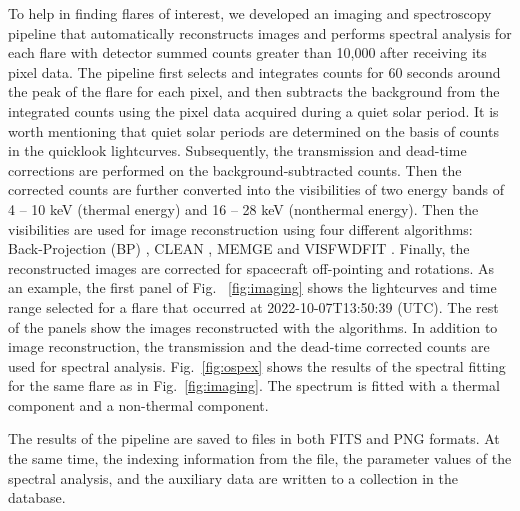 \documentclass[referee]{preaa} %
\begin{document}
To help in finding flares of interest, we developed an imaging and spectroscopy pipeline that automatically reconstructs images and performs spectral analysis for each flare with detector summed counts greater than 10,000
after receiving its pixel data. 
The pipeline first selects and integrates counts for 60 seconds around the peak of the flare for each pixel, and then subtracts the background from the integrated counts using the pixel data acquired during a quiet solar period. It is worth mentioning that quiet solar periods are determined on the basis of counts in the quicklook lightcurves. 
Subsequently, the transmission and dead-time corrections are performed on the background-subtracted counts. Then the corrected counts are further converted into the visibilities of two energy bands of 4 -- 10 keV (thermal energy) and 16 -- 28 keV (nonthermal energy). 
Then the visibilities are used for image reconstruction using four different algorithms: Back-Projection (BP) \citep{paolo2022}, CLEAN \citep{clean}, MEM\textunderscore GE \citep{mem, memge} and VIS\textunderscore FWDFIT \citep{visfwd}. Finally, the reconstructed images are corrected for spacecraft off-pointing and rotations. 
As an example,  the first panel of Fig. ~\ref{fig:imaging} shows the lightcurves and time range selected for a flare that occurred at 2022-10-07T13:50:39 (UTC). 
The rest of the panels show the images reconstructed with the algorithms. 
In addition to image reconstruction, the transmission and the dead-time corrected counts are used for spectral analysis. Fig.~\ref{fig:ospex} shows the results of the spectral fitting for the same flare as in Fig.~\ref{fig:imaging}. The spectrum is fitted with a thermal component and a non-thermal component. 

The results of the pipeline are saved to files in both FITS and PNG formats. At the same time, the indexing information from the file, the parameter values of the spectral analysis, and the auxiliary data are written to a collection in the database. 
\end{document}
